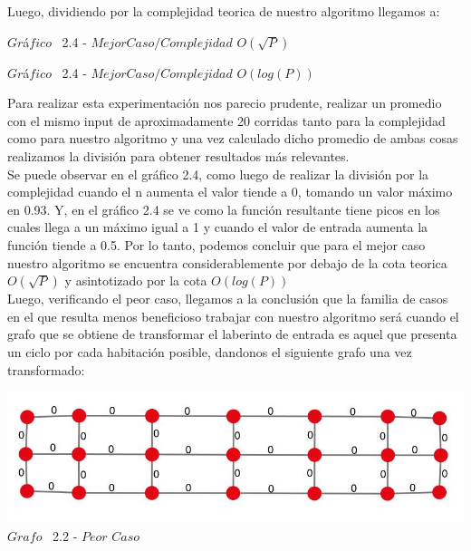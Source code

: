 Luego, dividiendo por la complejidad teorica de nuestro algoritmo llegamos a:\\

\vspace*{0.3cm} \vspace*{0.3cm}
  \begin{center}
{$Gr$\'a$fico$ \ 2.4 - $Mejor Caso / Complejidad$ $O(\sqrt{P})$}
  \end{center}
  \vspace*{0.3cm}

\vspace*{0.3cm} \vspace*{0.3cm}
  \begin{center}
{$Gr$\'a$fico$ \ 2.4 - $Mejor Caso / Complejidad$ $O(log(P))$}
  \end{center}
  \vspace*{0.3cm}

Para realizar esta experimentaci\'on nos parecio prudente, realizar un promedio con el mismo input de aproximadamente 20 corridas
tanto para la complejidad como para nuestro algoritmo y una vez calculado dicho promedio de ambas cosas realizamos la divisi\'on para
obtener resultados m\'as relevantes.\\ 

Se puede observar en el gr\'afico 2.4, como luego de realizar la divisi\'on por la complejidad cuando el n aumenta el valor tiende a 0, tomando un valor m\'aximo en 0.93. Y, en el gr\'afico 2.4 se ve como la funci\'on resultante tiene picos en los cuales llega a un m\'aximo igual a 1 y cuando el valor de entrada aumenta la funci\'on tiende a 0.5. Por lo tanto, podemos concluir que para el mejor caso nuestro algoritmo se encuentra considerablemente por debajo de la cota teorica $O(\sqrt{P})$ y asintotizado por la cota $O(log(P))$\\

Luego, verificando el peor caso, llegamos a la conclusi\'on que la familia de casos en el que resulta menos beneficioso trabajar con nuestro algoritmo ser\'a cuando el grafo que se obtiene de transformar el laberinto de entrada es aquel que presenta un ciclo por cada habitaci\'on posible, dandonos el siguiente grafo una vez transformado:\\


\vspace*{0.3cm} \vspace*{0.3cm}
  \begin{center}
 \includegraphics[scale=0.5]{./EJ2/ej2grafosinpared.jpeg}
 \\{$Grafo$ \ 2.2 - $Peor$ $Caso$}
  \end{center}
  \vspace*{0.3cm}
  
